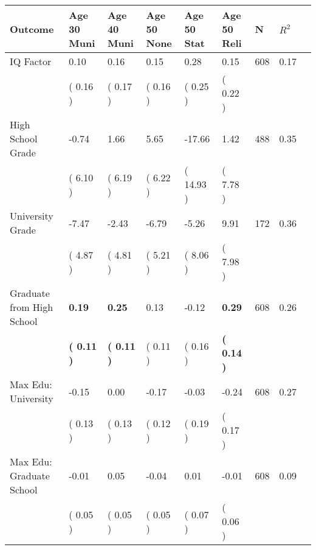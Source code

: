 \begin{tabular}{L{6.2cm} C{1.8cm} C{1.8cm} C{1.8cm} C{1.8cm} C{1.8cm} C{1.8cm} C{0.3cm} C{0.3cm}}
\toprule
 \textbf{Outcome} & \textbf{Age 30 Muni} & \textbf{Age 40 Muni} & \textbf{Age 50 None} & \textbf{Age 50 Stat} & \textbf{Age 50 Reli} & \textbf{N} & \textbf{$ R^2$} \\
\midrule
IQ Factor &      0.10 &      0.16 &      0.15 &      0.28 &      0.15  & 608 &       0.17 \\ 
 & (     0.16 ) & (     0.17 ) & (     0.16 ) & (     0.25 ) & (     0.22 )  & \\
High School Grade &     -0.74 &      1.66 &      5.65 &    -17.66 &      1.42  & 488 &       0.35 \\ 
 & (     6.10 ) & (     6.19 ) & (     6.22 ) & (    14.93 ) & (     7.78 )  & \\
University Grade &     -7.47 &     -2.43 &     -6.79 &     -5.26 &      9.91  & 172 &       0.36 \\ 
 & (     4.87 ) & (     4.81 ) & (     5.21 ) & (     8.06 ) & (     7.98 )  & \\
Graduate from High School & \textbf{     0.19} & \textbf{     0.25} &      0.13 &     -0.12 & \textbf{     0.29}  & 608 &       0.26 \\ 
 & \textbf{(     0.11 )} & \textbf{(     0.11 )} & (     0.11 ) & (     0.16 ) & \textbf{(     0.14 )}  & \\
Max Edu: University &     -0.15 &      0.00 &     -0.17 &     -0.03 &     -0.24  & 608 &       0.27 \\ 
 & (     0.13 ) & (     0.13 ) & (     0.12 ) & (     0.19 ) & (     0.17 )  & \\
Max Edu: Graduate School &     -0.01 &      0.05 &     -0.04 &      0.01 &     -0.01  & 608 &       0.09 \\ 
 & (     0.05 ) & (     0.05 ) & (     0.05 ) & (     0.07 ) & (     0.06 )  & \\
\bottomrule
\end{tabular}
